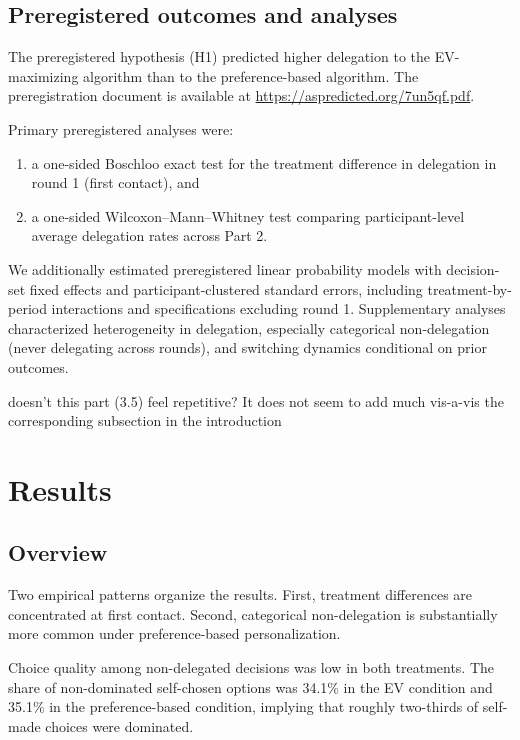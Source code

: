 \documentclass[a4paper, 12pt, fleqn]{article}
\theoremstyle{definition}
\begin{document}
\subsection{Preregistered outcomes and analyses}
The preregistered hypothesis (H1) predicted higher delegation to the EV-maximizing algorithm than to the preference-based algorithm.
The preregistration document is available at {\footnotesize\url{https://aspredicted.org/7un5qf.pdf}}.

Primary preregistered analyses were:
\begin{enumerate}
  \item a one-sided Boschloo exact test for the treatment difference in delegation in round 1 (first contact), and
  \item a one-sided Wilcoxon--Mann--Whitney test comparing participant-level average delegation rates across Part 2.
\end{enumerate}

We additionally estimated preregistered linear probability models with decision-set fixed effects and participant-clustered standard errors, including treatment-by-period interactions and specifications excluding round 1. Supplementary analyses characterized heterogeneity in delegation, especially categorical non-delegation (never delegating across rounds), and switching dynamics conditional on prior outcomes.
\begin{icomm}
	doesn't this part (3.5) feel repetitive? It does not seem to add much vis-a-vis the corresponding subsection in the introduction
\end{icomm}

\section{Results}
\label{sec:results}

\subsection{Overview}
Two empirical patterns organize the results. First, treatment differences are concentrated at first contact. Second, categorical non-delegation is substantially more common under preference-based personalization.

Choice quality among non-delegated decisions was low in both treatments. The share of non-dominated self-chosen options was 34.1\% in the EV condition and 35.1\% in the preference-based condition, implying that roughly two-thirds of self-made choices were dominated.
\end{document}
